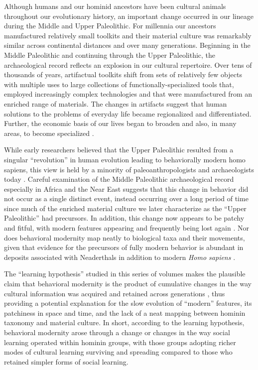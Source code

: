 Although humans and our hominid ancestors have been cultural animals
throughout our evolutionary history, an important change occurred in our
lineage during the Middle and Upper Paleolithic. For millennia our
ancestors manufactured relatively small toolkits and their material
culture was remarkably similar across continental distances and over
many generations. Beginning in the Middle Paleolithic and continuing
through the Upper Paleolithic, the archaeological record reflects an
explosion in our cultural repertoire. Over tens of thousands of years,
artifactual toolkits shift from sets of relatively few objects with
multiple uses to large collections of functionally-specialized tools
that, employed increasingly complex technologies and that were
manufactured from an enriched range of materials. The changes in
artifacts suggest that human solutions to the problems of everyday life
became regionalized and differentiated. Further, the economic basis of
our lives began to broaden and also, in many areas, to become
specialized \citep{bar2002upper, d2011evolution, guy2005mosaic}.

While early researchers believed that the Upper Paleolithic resulted
from a singular ``revolution'' in human evolution leading to
behaviorally modern homo sapiens, this view is held by a minority of
paleoanthropologists and archaeologists today
\citep[e.g.,][]{klein2009human}. Careful examination of the Middle
Paleolithic archaeological record especially in Africa and the Near East
suggests that this change in behavior did not occur as a single distinct
event, instead occurring over a long period of time since much of the
enriched material culture we later characterize as the ``Upper
Paleolithic'' had precursors. In addition, this change now appears to be
patchy and fitful, with modern features appearing and frequently being
lost again
\citep{bouzouggar200782, d2007additional, d2011evolution, guy2005mosaic, mcbrearty2000revolution, mcbrearty2007down}.
Nor does behavioral modernity map neatly to biological taxa and their
movements, given that evidence for the precursors of fully modern
behavior is abundant in deposits associated with Neaderthals in addition
to modern \emph{Homo sapiens} \citep{Villa:2014kl}.

The ``learning hypothesis'' studied in this series of volumes makes the
plausible claim that behavioral modernity is the product of cumulative
changes in the way cultural information was acquired and retained across
generations \citep{Nishiaki2013Introduction}, thus providing a potential
explanation for the slow evolution of ``modern'' features, its
patchiness in space and time, and the lack of a neat mapping between
hominin taxonomy and material culture. In short, according to the
learning hypothesis, behavioral modernity arose through a change or
changes in the way social learning operated within hominin groups, with
those groups adopting richer modes of cultural learning surviving and
spreading compared to those who retained simpler forms of social
learning.

